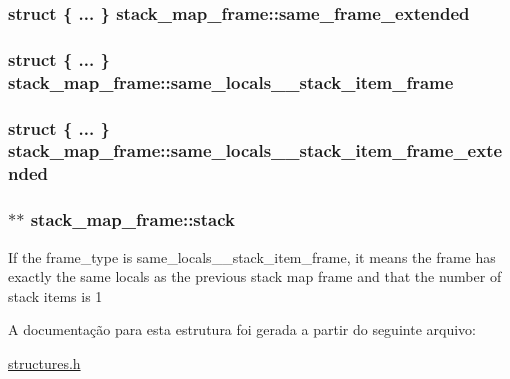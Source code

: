 \subsubsection[{\texorpdfstring{same\+\_\+frame\+\_\+extended}{same_frame_extended}}]{\setlength{\rightskip}{0pt plus 5cm}struct \{ ... \}   stack\+\_\+map\+\_\+frame\+::same\+\_\+frame\+\_\+extended}\hypertarget{structstack__map__frame_adf8e43e48aaaf7efd8ef26bcce53e07e}{}\label{structstack__map__frame_adf8e43e48aaaf7efd8ef26bcce53e07e}
\subsubsection[{\texorpdfstring{same\+\_\+locals\+\_\+1\+\_\+stack\+\_\+item\+\_\+frame}{same_locals_1_stack_item_frame}}]{\setlength{\rightskip}{0pt plus 5cm}struct \{ ... \}   stack\+\_\+map\+\_\+frame\+::same\+\_\+locals\+\_\+\_\+stack\+\_\+item\+\_\+frame}\hypertarget{structstack__map__frame_a5503eba82f65aaa1b91d7bebf48f778a}{}\label{structstack__map__frame_a5503eba82f65aaa1b91d7bebf48f778a}
\subsubsection[{\texorpdfstring{same\+\_\+locals\+\_\+1\+\_\+stack\+\_\+item\+\_\+frame\+\_\+extended}{same_locals_1_stack_item_frame_extended}}]{\setlength{\rightskip}{0pt plus 5cm}struct \{ ... \}   stack\+\_\+map\+\_\+frame\+::same\+\_\+locals\+\_\+\_\+stack\+\_\+item\+\_\+frame\+\_\+extended}\hypertarget{structstack__map__frame_a13c670726708696c2f2b9d12309d7038}{}\label{structstack__map__frame_a13c670726708696c2f2b9d12309d7038}
\subsubsection[{\texorpdfstring{stack}{stack}}]{$\ast$$\ast$ stack\+\_\+map\+\_\+frame\+::stack}\hypertarget{structstack__map__frame_acf0d1f6336e72271bc0d91186a9360d5}{}\label{structstack__map__frame_acf0d1f6336e72271bc0d91186a9360d5}
If the frame\+\_\+type is same\+\_\+locals\+\_\+\_\+stack\+\_\+item\+\_\+frame, it means the frame has exactly the same locals as the previous stack map frame and that the number of stack items is 1 

A documentação para esta estrutura foi gerada a partir do seguinte arquivo\+:\begin{DoxyCompactItemize}
\item 
\hyperlink{structures_8h}{structures.\+h}\end{DoxyCompactItemize}
